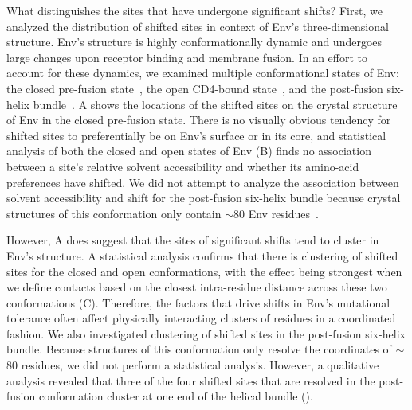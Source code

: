 \documentclass[9pt]{elife}
\begin{document}
\begin{figure}

\end{figure}

What distinguishes the sites that have undergone significant shifts?
First, we analyzed the distribution of shifted sites in context of Env's three-dimensional structure.
Env's structure is highly conformationally dynamic and undergoes large changes upon receptor binding and membrane fusion.
In an effort to account for these dynamics, we examined multiple conformational states of Env: the closed pre-fusion state~\citep{stewart2016trimeric}, the open CD4-bound state~\citep{ozorowski2017open}, and the post-fusion six-helix bundle~\citep{weissenhorn1997atomic}.
A shows the locations of the shifted sites on the crystal structure of Env in the closed pre-fusion state.
There is no visually obvious tendency for shifted sites to preferentially be on Env's surface or in its core, and statistical analysis of both the closed and open states of Env (B) finds no association between a site's relative solvent accessibility and whether its amino-acid preferences have shifted.
We did not attempt to analyze the association between solvent accessibility and shift for the post-fusion six-helix bundle because crystal structures of this conformation only contain $\sim$80 Env residues~\citep{weissenhorn1997atomic,chan1997core,tan1997atomic}.

However, A does suggest that the sites of significant shifts tend to cluster in Env's structure.
A statistical analysis confirms that there is clustering of shifted sites for the closed and open conformations, with the effect being strongest when we define contacts based on the closest intra-residue distance across these two conformations  (C).
Therefore, the factors that drive shifts in Env's mutational tolerance often affect physically interacting clusters of residues in a coordinated fashion.
We also investigated clustering of shifted sites in the post-fusion six-helix bundle.
Because structures of this conformation only resolve the coordinates of $\sim$80 residues, we did not perform a statistical analysis.
However, a qualitative analysis revealed that three of the four shifted sites that are resolved in the post-fusion conformation cluster at one end of the helical bundle ().
\end{document}
